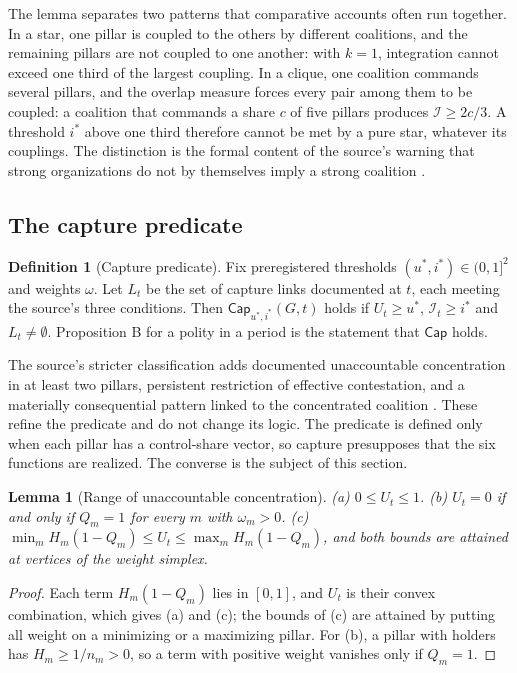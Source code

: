 \documentclass[11pt,letterpaper]{article}
\newtheorem{lemma}[theorem]{Lemma}
\theoremstyle{definition}
\newtheorem{definition}[theorem]{Definition}
\theoremstyle{remark}
\newcommand{\Integ}{\mathcal{I}}
\newcommand{\Capt}{\mathsf{Cap}}
\begin{document}
The lemma separates two patterns that comparative accounts often run together. In a star, one pillar is coupled to the others by different coalitions, and the remaining pillars are not coupled to one another: with $k=1$, integration cannot exceed one third of the largest coupling. In a clique, one coalition commands several pillars, and the overlap measure forces every pair among them to be coupled: a coalition that commands a share $c$ of five pillars produces $\Integ\ge2c/3$. A threshold $i^{*}$ above one third therefore cannot be met by a pure star, whatever its couplings. The distinction is the formal content of the source's warning that strong organizations do not by themselves imply a strong coalition \citep{largo2026hbs}.

\subsection{The capture predicate}

\begin{definition}[Capture predicate]
\label{def:formalized-state:cap}
Fix preregistered thresholds $(u^{*},i^{*})\in(0,1]^2$ and weights $\omega$. Let $L_t$ be the set of capture links documented at $t$, each meeting the source's three conditions. Then $\Capt_{u^{*},i^{*}}(G,t)$ holds if $U_t\ge u^{*}$, $\Integ_t\ge i^{*}$ and $L_t\neq\emptyset$. Proposition B for a polity in a period is the statement that $\Capt$ holds.
\end{definition}

The source's stricter classification adds documented unaccountable concentration in at least two pillars, persistent restriction of effective contestation, and a materially consequential pattern linked to the concentrated coalition \citep{largo2026hbs}. These refine the predicate and do not change its logic. The predicate is defined only when each pillar has a control-share vector, so capture presupposes that the six functions are realized. The converse is the subject of this section.

\begin{lemma}[Range of unaccountable concentration]
\label{lem:formalized-state:U}
(a) $0\le U_t\le1$. (b) $U_t=0$ if and only if $Q_m=1$ for every $m$ with $\omega_m>0$. (c) $\min_mH_m(1-Q_m)\le U_t\le\max_mH_m(1-Q_m)$, and both bounds are attained at vertices of the weight simplex.
\end{lemma}

\begin{proof}
Each term $H_m(1-Q_m)$ lies in $[0,1]$, and $U_t$ is their convex combination, which gives (a) and (c); the bounds of (c) are attained by putting all weight on a minimizing or a maximizing pillar. For (b), a pillar with holders has $H_m\ge1/n_m>0$, so a term with positive weight vanishes only if $Q_m=1$.
\end{proof}
\end{document}

